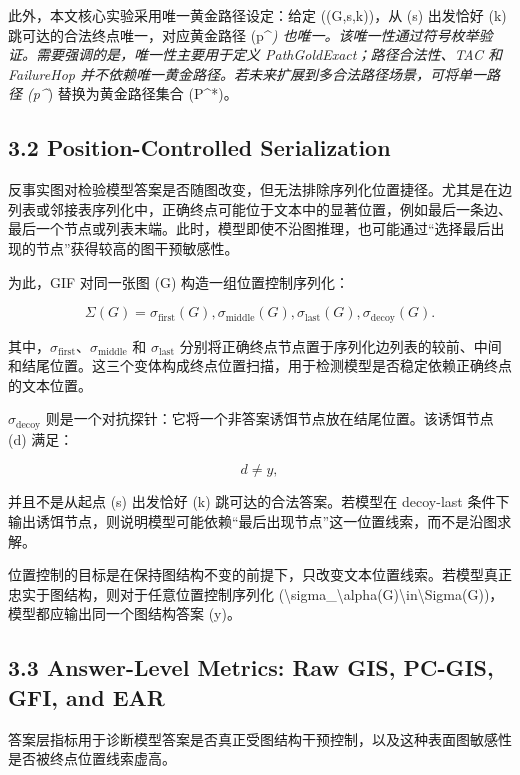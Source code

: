 \documentclass[
  11pt,
]{article}
\begin{document}
此外，本文核心实验采用唯一黄金路径设定：给定 ((G,s,k))，从 (s) 出发恰好
(k) 跳可达的合法终点唯一，对应黄金路径 (p\^{}\emph{)
也唯一。该唯一性通过符号枚举验证。需要强调的是，唯一性主要用于定义
PathGoldExact；路径合法性、TAC 和 FailureHop
并不依赖唯一黄金路径。若未来扩展到多合法路径场景，可将单一路径 (p\^{}})
替换为黄金路径集合 (P\^{}*)。

\subsection{3.2 Position-Controlled
Serialization}\label{position-controlled-serialization}

反事实图对检验模型答案是否随图改变，但无法排除序列化位置捷径。尤其是在边列表或邻接表序列化中，正确终点可能位于文本中的显著位置，例如最后一条边、最后一个节点或列表末端。此时，模型即使不沿图推理，也可能通过``选择最后出现的节点''获得较高的图干预敏感性。

为此，GIF 对同一张图 (G) 构造一组位置控制序列化：

\[
\Sigma(G)=  
{  
\sigma_{\text{first}}(G),  
\sigma_{\text{middle}}(G),  
\sigma_{\text{last}}(G),  
\sigma_{\text{decoy}}(G)  
}.  
\]

其中，\(\sigma_{\text{first}}\)、\(\sigma_{\text{middle}}\) 和
\(\sigma_{\text{last}}\)
分别将正确终点节点置于序列化边列表的较前、中间和结尾位置。这三个变体构成终点位置扫描，用于检测模型是否稳定依赖正确终点的文本位置。

\(\sigma_{\text{decoy}}\)
则是一个对抗探针：它将一个非答案诱饵节点放在结尾位置。该诱饵节点 (d)
满足：

\[
d\neq y,  
\]

并且不是从起点 (s) 出发恰好 (k) 跳可达的合法答案。若模型在 decoy-last
条件下输出诱饵节点，则说明模型可能依赖``最后出现节点''这一位置线索，而不是沿图求解。

位置控制的目标是在保持图结构不变的前提下，只改变文本位置线索。若模型真正忠实于图结构，则对于任意位置控制序列化
(\textbackslash sigma\_\textbackslash alpha(G)\textbackslash in\textbackslash Sigma(G))，模型都应输出同一个图结构答案
(y)。

\subsection{3.3 Answer-Level Metrics: Raw GIS, PC-GIS, GFI, and
EAR}\label{answer-level-metrics-raw-gis-pc-gis-gfi-and-ear}

答案层指标用于诊断模型答案是否真正受图结构干预控制，以及这种表面图敏感性是否被终点位置线索虚高。
\end{document}
